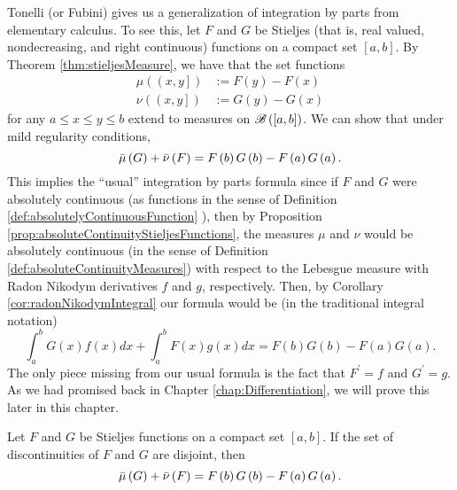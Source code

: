 Tonelli (or Fubini) gives us a generalization of integration by parts
from elementary calculus. To see this, let $F$ and $G$ be Stieljes
(that is, real valued, nondecreasing, and right continuous) functions
on a compact set $\left[a,b\right].$ By Theorem \ref{thm:stieljesMeasure},
we have that the set functions 
\begin{align*}
\mu\left(\left(x,y\right]\right) & :=F\left(y\right)-F\left(x\right)\\
\nu\left(\left(x,y\right]\right) & :=G\left(y\right)-G\left(x\right)
\end{align*}
for any $a\leq x\leq y\leq b$ extend to measures on $\mathscr{B}\left(\left[a,b\right]\right)$.
We can show that under mild regularity conditions, 
\[
\bar{\mu}\left(G\right)+\bar{\nu}\left(F\right)=F\left(b\right)G\left(b\right)-F\left(a\right)G\left(a\right).
\]
This implies the ``usual'' integration by parts formula since if $F$ and $G$ were absolutely continuous (as functions in the sense of Definition \ref{def:absolutelyContinuousFunction} ), then by Proposition \ref{prop:absoluteContinuityStieljesFunctions}, the measures $\mu$ and $\nu$ would be absolutely continuous (in the sense of Definition \ref{def:absoluteContinuityMeasures}) with respect to the Lebesgue measure with Radon Nikodym derivatives $f$ and $g$, respectively. Then, by Corollary \ref{cor:radonNikodymIntegral} our formula would be (in the traditional integral notation)
\[
	\int_{a}^{b}G(x)f(x)dx + \int_{a}^{b}F(x)g(x)dx = F\left(b\right)G\left(b\right)-F\left(a\right)G\left(a\right).
\]
The only piece missing from our usual formula is the fact that $F^\prime = f$ and $G^\prime = g$. As we had promised back in Chapter \ref{chap:Differentiation}, we will prove this later in this chapter.
\begin{thm}
\label{thm:generalizedIntegrationByParts}Let $F$ and $G$ be Stieljes
functions on a compact set $\left[a,b\right]$. If the set of discontinuities
of $F$ and $G$ are disjoint, then
\[
\bar{\mu}\left(G\right)+\bar{\nu}\left(F\right)=F\left(b\right)G\left(b\right)-F\left(a\right)G\left(a\right).
\]
\end{thm}

